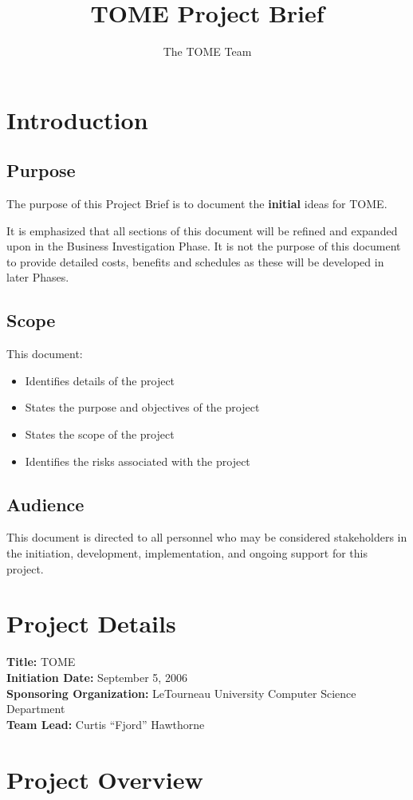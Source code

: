 \documentclass[12pt,titlepage]{article}
\author{The TOME Team}
\title{\textbf{TOME Project Brief}}
\begin{document}
\maketitle
\tableofcontents
\listoffigures
\newpage
\section{Introduction}
\subsection{Purpose}
The purpose of this Project Brief is to document the \textbf{initial} ideas for TOME.

It is emphasized that all sections of this document will be refined and expanded upon in the Business Investigation Phase.  It is not the purpose of this document to provide detailed costs, benefits and schedules as these will be developed in later Phases.

\subsection{Scope}
This document:
\begin{itemize}
	\item Identifies details of the project
	\item States the purpose and objectives of the project
	\item States the scope of the project
	\item Identifies the risks associated with the project
\end{itemize}
\subsection{Audience}
This document is directed to all personnel who may be considered stakeholders in the initiation, development, implementation, and ongoing support for this project.
\section{Project Details}
\textbf{Title:} TOME\\
\textbf{Initiation Date:} September 5, 2006\\
\textbf{Sponsoring Organization:} LeTourneau University Computer Science Department\\
\textbf{Team Lead:} Curtis ``Fjord'' Hawthorne
\section{Project Overview}
\end{document}
